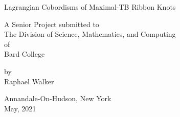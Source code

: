 \thispagestyle{plain}
\begin{titlepage}
    \begin{center}

        \Huge{Lagrangian Cobordisms of Maximal-TB Ribbon Knots}

        \vfill

        \Large{A Senior Project submitted to\\ The Division of Science, Mathematics, and Computing\\ of\\ Bard College}

        \vspace{1em}

        \Large{by\\ Raphael Walker}

        \vfill

        \Large{Annandale-On-Hudson, New York\\ May, 2021}

        \vspace{1in}

    \end{center}
\end{titlepage}
